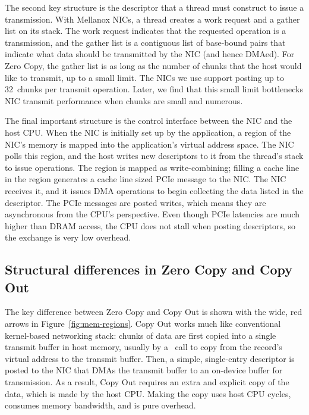 The second key structure is the descriptor that a thread must construct to
issue a transmission. With Mellanox NICs, a thread creates a work request and a
gather list on its stack. The work request indicates that the requested
operation is a transmission, and the gather list is a contiguous list of
base-bound pairs that indicate what data should be transmitted by the NIC (and
hence DMAed). For Zero Copy, the gather list is as long as the number of chunks
that the host would like to transmit, up to a small limit. The NICs we use support
posting up to 32~chunks per transmit operation. Later, we find that this small
limit bottlenecks NIC transmit performance when chunks are small and numerous.

The final important structure is the control interface between the NIC and the
host CPU.  When the NIC is initially set up by the application, a region of the
NIC's memory is mapped into the application's virtual address space. The NIC
polls this region, and the host writes new descriptors to it from the thread's
stack to issue operations. The region is mapped as write-combining; filling a
cache line in the region generates a cache line sized PCIe message to the NIC.
The NIC receives it, and it issues DMA operations to begin collecting the data
listed in the descriptor. The PCIe messages are posted writes, which means they
are asynchronous from the CPU's perspective. Even though PCIe latencies are much
higher than DRAM access, the CPU does not stall when posting descriptors, so the
exchange is very low overhead.
\subsection{Structural differences in Zero Copy and Copy Out}
The key difference between Zero Copy and Copy Out is shown with the wide, red
arrows in Figure~\ref{fig:mem-regions}. Copy Out works much like conventional
kernel-based networking stack: chunks of data are first copied into a single
transmit buffer in host memory, usually by a \memcpy ~call to copy from the record's 
virtual address to the transmit buffer. Then, a simple, single-entry descriptor is
posted to the NIC that DMAs the transmit buffer to an on-device buffer for transmission.
As a result, Copy Out requires an extra and explicit copy of the data, which is made
by the host CPU.  Making the copy uses host CPU cycles, consumes memory
bandwidth, and is pure overhead. 



